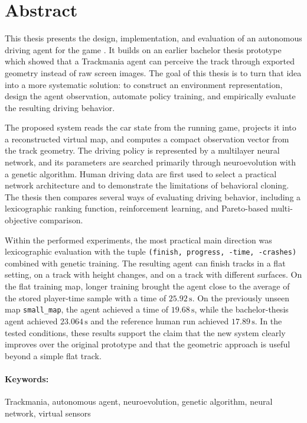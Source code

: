 \newpage
\section*{Abstract}

This thesis presents the design, implementation, and evaluation of an autonomous driving agent for the game \Trackmania{}. It builds on an earlier bachelor thesis prototype which showed that a Trackmania agent can perceive the track through exported geometry instead of raw screen images. The goal of this thesis is to turn that idea into a more systematic solution: to construct an environment representation, design the agent observation, automate policy training, and empirically evaluate the resulting driving behavior.

The proposed system reads the car state from the running game, projects it into a reconstructed virtual map, and computes a compact observation vector from the track geometry. The driving policy is represented by a multilayer neural network, and its parameters are searched primarily through neuroevolution with a genetic algorithm. Human driving data are first used to select a practical network architecture and to demonstrate the limitations of behavioral cloning. The thesis then compares several ways of evaluating driving behavior, including a lexicographic ranking function, reinforcement learning, and Pareto-based multi-objective comparison.

Within the performed experiments, the most practical main direction was lexicographic evaluation with the tuple \texttt{(finish, progress, -time, -crashes)} combined with genetic training. The resulting agent can finish tracks in a flat setting, on a track with height changes, and on a track with different surfaces. On the flat training map, longer training brought the agent close to the average of the stored player-time sample with a time of \(25.92\,\mathrm{s}\). On the previously unseen map \texttt{small\_map}, the agent achieved a time of \(19.68\,\mathrm{s}\), while the bachelor-thesis agent achieved \(23.064\,\mathrm{s}\) and the reference human run achieved \(17.89\,\mathrm{s}\). In the tested conditions, these results support the claim that the new system clearly improves over the original prototype and that the geometric approach is useful beyond a simple flat track.

\paragraph*{Keywords:} Trackmania, autonomous agent, neuroevolution, genetic algorithm, neural network, virtual sensors
